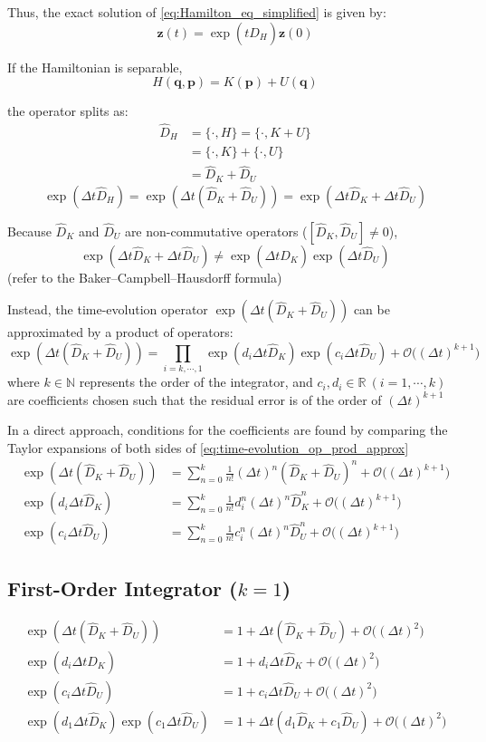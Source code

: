 \documentclass{article}
\newcommand{\bb}[1]{\mathbb{#1}}
\renewcommand{\vec}[1]{\boldsymbol{#1}}
\renewcommand{\order}[1]{\mathcal{O}\big(#1\big)}
\begin{document}
Thus, the exact solution of \eqref{eq:Hamilton_eq_simplified} is given by:
\[ \vec{z}(t) = \exp(t \hat{D}_H) \vec{z}(0) \]

If the Hamiltonian is separable, 
\[ H(\vec{q},\vec{p}) = K(\vec{p}) + U(\vec{q}) \]

the operator splits as:
\begin{align*}
	\hat{D}_H &= \{ \cdot , H \} =\{ \cdot , K+U \} \\
	&= \{ \cdot, K\} + \{ \cdot, U\} \\
	&= \hat{D}_K + \hat{D}_U
\end{align*}
\[ \exp(\Delta t \hat{D}_H) = \exp(\Delta t (\hat{D}_K + \hat{D}_U) ) = \exp(\Delta t \hat{D}_K + \Delta t \hat{D}_U ) \]

Because $\hat{D}_K$ and $\hat{D}_U$ are non-commutative operators ($[\hat{D}_K, \hat{D}_U] \neq 0$),
\[ \exp(\Delta t \hat{D}_K + \Delta t \hat{D}_U ) \neq \exp(\Delta t \hat{D}_K) \exp(\Delta t \hat{D}_U) \]
(refer to the Baker--Campbell--Hausdorff formula)

Instead, the time-evolution operator $\exp(\Delta t (\hat{D}_K + \hat{D}_U) )$ can be approximated by a product of operators:
\begin{equation}\label{eq:time-evolution_op_prod_approx}
	\exp(\Delta t (\hat{D}_K + \hat{D}_U) ) = \prod_{i=k,\cdots,1} \exp(d_i \Delta t \hat{D}_K) \exp(c_i \Delta t \hat{D}_U) + \order{(\Delta t)^{k+1}}
\end{equation}
where $k\in \bb{N}$ represents the order of the integrator, and $c_i, d_i \in \bb{R} \ (i = 1,\cdots,k)$ are coefficients chosen such that the residual error is of the order of $(\Delta t)^{k+1}$

In a direct approach, conditions for the coefficients are found by comparing the Taylor expansions of both sides of \eqref{eq:time-evolution_op_prod_approx}
\begin{align*}
	\exp(\Delta t (\hat{D}_K + \hat{D}_U) ) &= \sum_{n=0}^{k} \frac{1}{n!}(\Delta t)^n (\hat{D}_K + \hat{D}_U)^n + \order{(\Delta t)^{k+1}} \\
	\exp(d_i \Delta t \hat{D}_K) &= \sum_{n=0}^{k} \frac{1}{n!}d_i^n(\Delta t)^n \hat{D}_K^n + \order{(\Delta t)^{k+1}} \\
	\exp(c_i \Delta t \hat{D}_U) &= \sum_{n=0}^{k} \frac{1}{n!}c_i^n(\Delta t)^n \hat{D}_U^n + \order{(\Delta t)^{k+1}}
\end{align*}

\subsection{First-Order Integrator ($k=1$)}
\begin{align*}
	\exp(\Delta t (\hat{D}_K + \hat{D}_U) ) &= 1 + \Delta t (\hat{D}_K + \hat{D}_U) + \order{(\Delta t)^2} \\
	\exp(d_i \Delta t \hat{D}_K) &= 1 + d_i \Delta t \hat{D}_K + \order{(\Delta t)^2} \\
	\exp(c_i \Delta t \hat{D}_U) &= 1 + c_i \Delta t \hat{D}_U + \order{(\Delta t)^2} \\
	\exp(d_1 \Delta t \hat{D}_K) \exp(c_1 \Delta t \hat{D}_U) &= 1 + \Delta t (d_1 \hat{D}_K + c_1 \hat{D}_U) + \order{(\Delta t)^2}
\end{align*}
\end{document}
